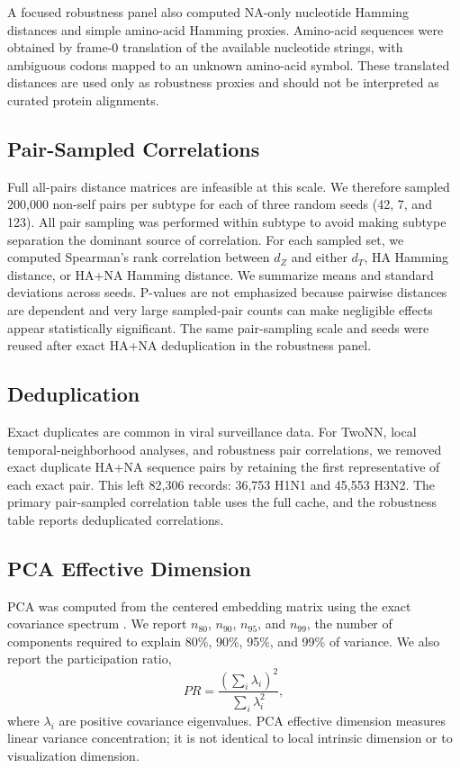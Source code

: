 \documentclass[11pt]{article}
\begin{document}
A focused robustness panel also computed NA-only nucleotide Hamming distances and simple amino-acid Hamming proxies. Amino-acid sequences were obtained by frame-0 translation of the available nucleotide strings, with ambiguous codons mapped to an unknown amino-acid symbol. These translated distances are used only as robustness proxies and should not be interpreted as curated protein alignments.

\subsection{Pair-Sampled Correlations}

Full all-pairs distance matrices are infeasible at this scale. We therefore sampled 200,000 non-self pairs per subtype for each of three random seeds (42, 7, and 123). All pair sampling was performed within subtype to avoid making subtype separation the dominant source of correlation. For each sampled set, we computed Spearman's rank correlation \cite{spearman1904} between $d_Z$ and either $d_T$, HA Hamming distance, or HA+NA Hamming distance. We summarize means and standard deviations across seeds. P-values are not emphasized because pairwise distances are dependent and very large sampled-pair counts can make negligible effects appear statistically significant. The same pair-sampling scale and seeds were reused after exact HA+NA deduplication in the robustness panel.

\subsection{Deduplication}

Exact duplicates are common in viral surveillance data. For TwoNN, local temporal-neighborhood analyses, and robustness pair correlations, we removed exact duplicate HA+NA sequence pairs by retaining the first representative of each exact pair. This left 82,306 records: 36,753 H1N1 and 45,553 H3N2. The primary pair-sampled correlation table uses the full cache, and the robustness table reports deduplicated correlations.

\subsection{PCA Effective Dimension}

PCA was computed from the centered embedding matrix using the exact covariance spectrum \cite{jolliffe2002pca,jolliffe2016pca}. We report $n_{80}$, $n_{90}$, $n_{95}$, and $n_{99}$, the number of components required to explain 80\%, 90\%, 95\%, and 99\% of variance. We also report the participation ratio,
\[
PR=\frac{(\sum_i\lambda_i)^2}{\sum_i\lambda_i^2},
\]
where $\lambda_i$ are positive covariance eigenvalues. PCA effective dimension measures linear variance concentration; it is not identical to local intrinsic dimension or to visualization dimension.
\end{document}
